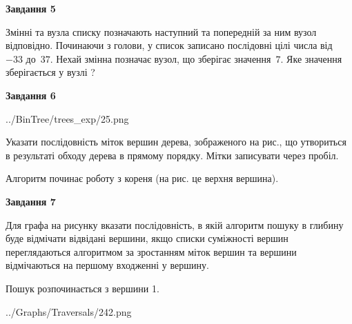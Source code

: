 \documentclass[12pt, ukrainian]{article}
\begin{document}
{\begin {large}
{\begin {center}\textbf{Завдання 5}\end {center}}\par
Змінні  та  вузла списку позначають наступний та попередній за ним вузол відповідно. Починаючи з голови, у список записано послідовні цілі числа від~$-33$ до~$37$. Нехай змінна  позначає вузол, що зберігає значення~$7$.
Яке значення зберігається у вузлі  ?\par
\newpage

{\begin {center}\textbf{Завдання 6}\end {center}}\par

\begin{center}
	{../BinTree/trees_exp/25.png}
\end{center}
Указати послідовність міток вершин дерева, зображеного на рис., що утвориться в результаті обходу дерева в прямому порядку. Мітки записувати через пробіл.\par Алгоритм починає роботу з кореня (на рис. це верхня вершина).\par
\newpage

{\begin {center}\textbf{Завдання 7}\end {center}}\par
Для графа на рисунку вказати послідовність, в якій алгоритм пошуку в глибину буде відмічати відвідані вершини, якщо списки суміжності вершин переглядаються алгоритмом за зростанням міток вершин та вершини відмічаються на першому вход\-женні у вершину.\par
Пошук розпочинається з вершини 1.\par

\begin{center}
	{../Graphs/Traversals/242.png}
\end{center}\par
\newpage


\end{large}}
\end{document}
